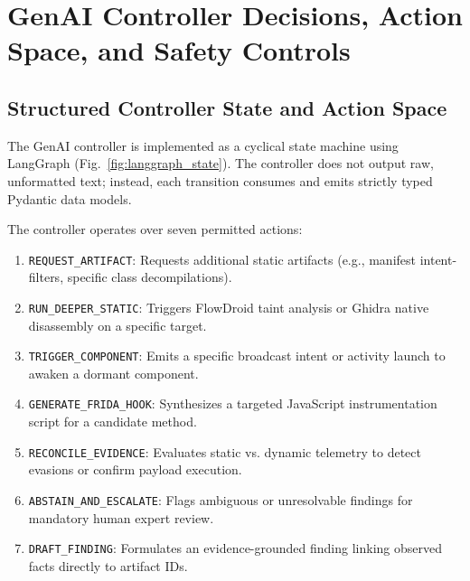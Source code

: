 \documentclass[conference]{IEEEtran}
\begin{document}
\section{GenAI Controller Decisions, Action Space, and Safety Controls}

\subsection{Structured Controller State and Action Space}
The GenAI controller is implemented as a cyclical state machine using LangGraph (Fig.~\ref{fig:langgraph_state}). The controller does not output raw, unformatted text; instead, each transition consumes and emits strictly typed Pydantic data models.

The controller operates over seven permitted actions:
\begin{enumerate}
    \item \texttt{REQUEST\_ARTIFACT}: Requests additional static artifacts (e.g., manifest intent-filters, specific class decompilations).
    \item \texttt{RUN\_DEEPER\_STATIC}: Triggers FlowDroid taint analysis or Ghidra native disassembly on a specific target.
    \item \texttt{TRIGGER\_COMPONENT}: Emits a specific broadcast intent or activity launch to awaken a dormant component.
    \item \texttt{GENERATE\_FRIDA\_HOOK}: Synthesizes a targeted JavaScript instrumentation script for a candidate method.
    \item \texttt{RECONCILE\_EVIDENCE}: Evaluates static vs. dynamic telemetry to detect evasions or confirm payload execution.
    \item \texttt{ABSTAIN\_AND\_ESCALATE}: Flags ambiguous or unresolvable findings for mandatory human expert review.
    \item \texttt{DRAFT\_FINDING}: Formulates an evidence-grounded finding linking observed facts directly to artifact IDs.
\end{enumerate}
\end{document}
